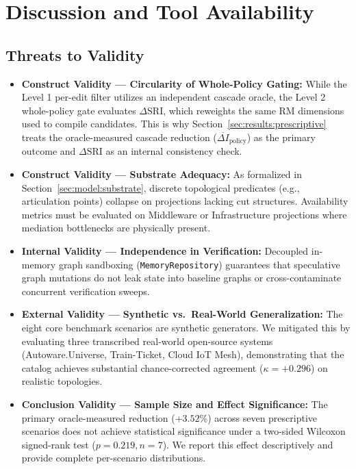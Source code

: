 \section{Discussion and Tool Availability}
\label{sec:discussion}

\subsection{Threats to Validity}
\label{sec:disc:threats}

\begin{itemize}
    \item \textbf{Construct Validity --- Circularity of Whole-Policy Gating:} While the Level 1 per-edit filter utilizes an independent cascade oracle, the Level 2 whole-policy gate evaluates $\Delta\mathrm{SRI}$, which reweights the same RM dimensions used to compile candidates. This is why Section~\ref{sec:results:prescriptive} treats the oracle-measured cascade reduction ($\overline{\Delta I}_{\text{policy}}$) as the primary outcome and $\Delta\mathrm{SRI}$ as an internal consistency check.
    \item \textbf{Construct Validity --- Substrate Adequacy:} As formalized in Section~\ref{sec:model:substrate}, discrete topological predicates (e.g., articulation points) collapse on projections lacking cut structures. Availability metrics must be evaluated on Middleware or Infrastructure projections where mediation bottlenecks are physically present.
    \item \textbf{Internal Validity --- Independence in Verification:} Decoupled in-memory graph sandboxing (\texttt{MemoryRepository}) guarantees that speculative graph mutations do not leak state into baseline graphs or cross-contaminate concurrent verification sweeps.
    \item \textbf{External Validity --- Synthetic vs.\ Real-World Generalization:} The eight core benchmark scenarios are synthetic generators. We mitigated this by evaluating three transcribed real-world open-source systems (Autoware.Universe, Train-Ticket, Cloud IoT Mesh), demonstrating that the catalog achieves substantial chance-corrected agreement ($\kappa = +0.296$) on realistic topologies.
    \item \textbf{Conclusion Validity --- Sample Size and Effect Significance:} The primary oracle-measured reduction ($+3.52\%$) across seven prescriptive scenarios does not achieve statistical significance under a two-sided Wilcoxon signed-rank test ($p = 0.219, n=7$). We report this effect descriptively and provide complete per-scenario distributions.
\end{itemize}

